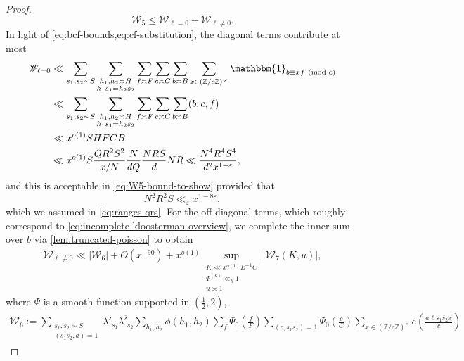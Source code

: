 \documentclass[reqno,11pt]{amsart}
\theoremstyle{remark}
\numberwithin{equation}{section}
\newcommand{\Z}{\mathbb{Z}}
\newcommand{\msW}{\mathscr{W}}
\newcommand{\one}{\mathbbm{1}}
\newcommand{\eps}{\varepsilon}
\renewcommand{\bar}{\overline}
\renewcommand{\pmod}[1]{\ (\textnormal{mod } #1)}
\begin{document}
\begin{proof}
\begin{equation} \label{eq:W5-split}
    \msW_5
    \le \msW_{\ell=0} + \msW_{\ell \neq 0}.
\end{equation}
In light of \cref{eq:bcf-bounds,eq:cf-substitution}, the diagonal terms contribute at most
\begin{equation} \label{eq:W-diagonal-bound}
\begin{aligned}
    \msW_{\ell = 0}
    &\ll 
    \sum_{s_1, s_2 \sim S} 
    \sum_{\substack{h_1, h_2 \asymp H \\ h_1 s_1 = h_2 s_2}}
    \sum_{f \asymp F}
    \sum_{c \asymp C}
    \sum_{b \asymp B} \sum_{x \in (\Z/c\Z)^\times} \one_{b \equiv xf \pmod{c}}
    \\
    &\ll 
    \sum_{s_1, s_2 \sim S} 
    \sum_{\substack{h_1, h_2 \asymp H \\ h_1 s_1 = h_2 s_2}}
    \sum_{f \asymp F}
    \sum_{c \asymp C}
    \sum_{b \asymp B} (b, c, f)
    \\
    &\ll 
    x^{o(1)}
    S H F C B
    \\
    &\ll
    x^{o(1)} S \frac{Q R^2 S^2}{x/N} \frac{N}{dQ} \frac{NRS}{d} NR
    \ll
    \frac{N^4 R^4 S^4}{d^2 x^{1-\eps}},
\end{aligned}
\end{equation}
and this is acceptable in \cref{eq:W5-bound-to-show} provided that
\[
    N^2 R^2 S \ll_\eps x^{1-8\eps},
\]
which we assumed in \cref{eq:ranges-qrs}. For the off-diagonal terms, which roughly correspond to \cref{eq:incomplete-kloosterman-overview}, we complete the inner sum over $b$ via \cref{lem:truncated-poisson} to obtain
\begin{equation} \label{eq:W-off-diagonal-split}
\begin{aligned}
    \msW_{\ell \neq 0} \ll |\msW_6|
    +
    O(x^{-90})
    +
    x^{o(1)} \sup_{\substack{K \ll x^{o(1)} B^{-1} C \\ \Psi^{(k)} \ll_k 1 \\ u \asymp 1}} |\msW_7(K, u)|,
\end{aligned}
\end{equation}
where $\Psi$ is a smooth function supported in $(\frac{1}{2}, 2)$,
\[
\begin{aligned}
    \msW_6 := \sum_{\substack{s_1, s_2 \sim S \\ (s_1 s_2, a) = 1}} \lambda'_{s_1} \bar{\lambda'_{s_2}}
    \sum_{h_1, h_2} \phi(h_1, h_2)
    \sum_{f} \Psi_0\left(\frac{f}{F}\right)
    \sum_{(c, s_1s_2) = 1} \Psi_0\left(\frac{c}{C}\right)
    \sum_{x \in (\Z/c\Z)^\times}
    e\left(\frac{a\ell \bar{s_1s_2 x}}{c}\right)

\end{aligned}\]
\end{proof}
\end{document}
